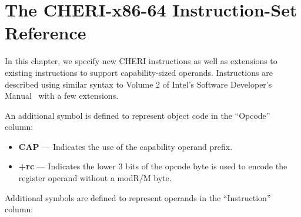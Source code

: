 \chapter{The CHERI-x86-64 Instruction-Set Reference}
\label{chap:isaref-x86-64}


\newenvironment{x86opcodetable}{%
  \tabularx{\textwidth}{| l | l | p{2.0em} | p{2.5em} | p{2.5em} | Z |} \hline
    \textbf{Opcode} & \textbf{Instruction} & \textbf{Op/ En} &
    \textbf{Cap Mode} & \textbf{64-bit Mode} & \textbf{Description}\\
    \hline
}{%
  \endtabularx
}

\newcommand{\xopcode}[6]{%
  #1 & #2 & #3 & #4 & #5 & #6\\
  \hline
}

\newenvironment{x86opentable}{%
  \bigskip
  \noindent
  \tabularx{\textwidth}{| c | Y | Y | Y | Y |}
    \multicolumn{5}{c}{\bfseries Instruction Operand Encoding}\\
    \hline
    Op/En & Operand 1 & Operand 2 & Operand 3 & Operand 4\\
    \hline
}{%
  \endtabularx
}

\newcommand{\xopen}[5]{%
  #1 & #2 & #3 & #4 & #5\\
  \hline
}

In this chapter, we specify new CHERI instructions as well as
extensions to existing instructions to support capability-sized
operands.  Instructions are described using similar syntax to Volume 2
of Intel's Software Developer's Manual~\cite{intel-sdm-vol2} with a
few extensions.

An additional symbol is defined to represent object code in the
``Opcode'' column:

\begin{itemize}
  \item \textbf{CAP} { }---{ } Indicates the use of the capability
    operand prefix.

  \item \textbf{+rc} { }---{ } Indicates the lower 3 bits of the
    opcode byte is used to encode the register operand without a
    modR/M byte.
\end{itemize}

Additional symbols are defined to represent operands in the
``Instruction'' column:

